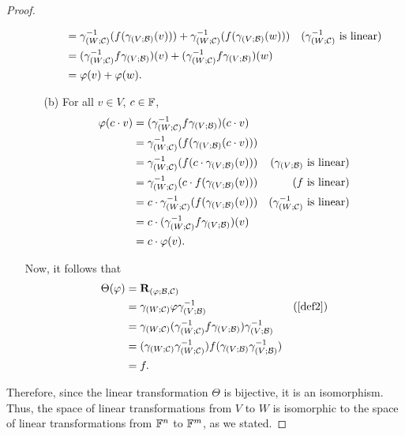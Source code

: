 \begin{proof}
\begin{enumerate}
\begin{itemize}
\begin{align*}
                               &= \gamma_{(W; \mathcal{C})}^{-1}(f(\gamma_{(V; \mathcal{B})}(v))) + \gamma_{(W; \mathcal{C})}^{-1}(f(\gamma_{(V; \mathcal{B})}(w)))                         &\text{($\gamma_{(W; \mathcal{C})}^{-1}$ is linear)} \\
                               &= (\gamma_{(W; \mathcal{C})}^{-1} f \gamma_{(V; \mathcal{B})})(v) + (\gamma_{(W; \mathcal{C})}^{-1} f \gamma_{(V; \mathcal{B})})(w) \\
                               &= \varphi(v) + \varphi(w).
            \end{align*}
            
            \item[(b)] For all $v \in V$, $c \in \mathbb{F}$,
            \begin{align*}
                \varphi(c \cdot v) &= (\gamma_{(W; \mathcal{C})}^{-1} f \gamma_{(V; \mathcal{B})})(c \cdot v) \\
                                   &= \gamma_{(W; \mathcal{C})}^{-1}(f(\gamma_{(V; \mathcal{B})}(c \cdot v))) \\
                                   &= \gamma_{(W; \mathcal{C})}^{-1}(f(c \cdot \gamma_{(V; \mathcal{B})}(v)))             &\text{($\gamma_{(V; \mathcal{B})}$ is linear)} \\
                                   &= \gamma_{(W; \mathcal{C})}^{-1}(c \cdot f (\gamma_{(V; \mathcal{B})}(v)))            &\text{($f$ is linear)} \\
                                   &= c \cdot \gamma_{(W; \mathcal{C})}^{-1}(f(\gamma_{(V; \mathcal{B})}(v)))             &\text{($\gamma_{(W; \mathcal{C})}^{-1}$ is linear)} \\
                                   &= c \cdot (\gamma_{(W; \mathcal{C})}^{-1} f \gamma_{(V; \mathcal{B})})(v) \\
                                   &= c \cdot \varphi(v).
            \end{align*}
        \end{itemize}
        Now, it follows that
        \begin{align*}
            \Theta(\varphi) &= \rep{\varphi} \\
                            &= \compthr{\comap{W}{\C}}{\varphi}{\comap{V}{\B}^{-1}}                                          &\text{(\cref{def2})} \\
                            &= \compthr{\comap{W}{\C}}{(\compthr{\comap{W}{\C}^{-1}}{f}{\comap{V}{\B}})}{\comap{V}{\B}^{-1}} \\
                            &= \compthr{(\comptwo{\comap{W}{\C}}{\comap{W}{\C}^{-1}})}{f}{(\comptwo{\comap{V}{\B}}{\comap{V}{\B}^{-1}})} \\
                            &= f.
        \end{align*}
    \end{enumerate}
    Therefore, since the linear transformation $\Theta$ is bijective, it is an
    isomorphism. Thus, the space of linear transformations from $V$ to $W$ is
    isomorphic to the space of linear transformations from $\mathbb{F}^{n}$ to $\mathbb{F}^{m}$,
    as we stated.
\end{proof}
